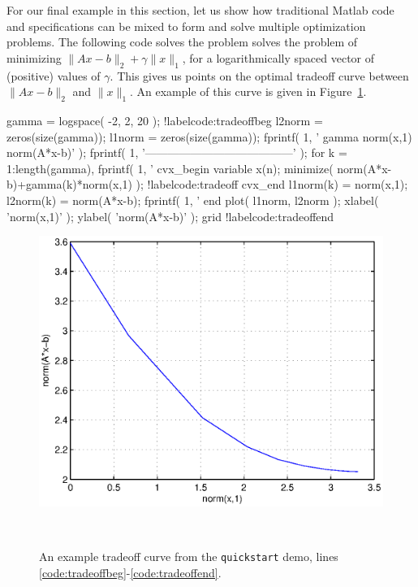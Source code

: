 \documentclass[12pt]{article}
\begin{document}
For our final example in this section, let us show how traditional
Matlab code and \cvx specifications can be mixed to form and solve
multiple optimization problems. The following code solves the problem
solves the problem of minimizing $\|Ax-b\|_2 +\gamma \|x\|_1$,
for a logarithmically spaced vector
of (positive) values of $\gamma$. This gives us points on the optimal
tradeoff curve between $\|Ax-b\|_2$ and $\|x\|_1$. An example of this
curve is given in Figure~\ref{fig:tradeoff}.
\begin{code2}[firstnumber=268]
	gamma = logspace( -2, 2, 20 ); !label{code:tradeoffbeg}
	l2norm = zeros(size(gamma));
	l1norm = zeros(size(gamma));
	fprintf( 1, '   gamma       norm(x,1)    norm(A*x-b)\n' );
	fprintf( 1, '---------------------------------------\n' );
	for k = 1:length(gamma),
	    fprintf( 1, '%
	    cvx_begin
	        variable x(n);
	        minimize( norm(A*x-b)+gamma(k)*norm(x,1) );	!label{code:tradeoff}
	    cvx_end
	    l1norm(k) = norm(x,1);
	    l2norm(k) = norm(A*x-b);
	    fprintf( 1, '   %
	end
	plot( l1norm, l2norm );
	xlabel( 'norm(x,1)' );
	ylabel( 'norm(A*x-b)' );
	grid !label{code:tradeoffend}
\end{code2}
\begin{figure}
\begin{center}
\includegraphics[width=4.5in]{tradeoff.eps}
\end{center}
~\\[-48pt]
\caption{An example tradeoff curve from the \texttt{quickstart} demo, lines \ref{code:tradeoffbeg}-\ref{code:tradeoffend}.}
\label{fig:tradeoff}
\end{figure}
\end{document}

